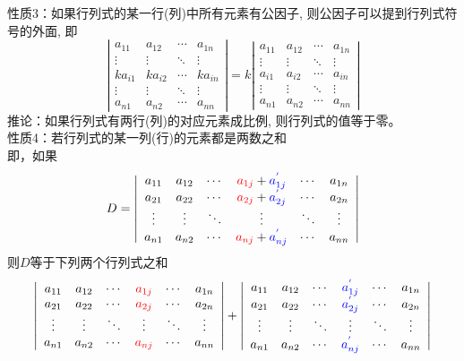 {\color{blue}性质3：}如果行列式的某一行(列)中所有元素有公因子, 则公因子可以提到行列式符号的外面, 即
$$
\left|
\begin{array}{cccc}
a_{11} & a_{12} & \cdots & a_{1n} \\
\vdots & \vdots & \ddots & \vdots \\
ka_{i1} & ka_{i2} & \cdots & ka_{in} \\
\vdots & \vdots & \ddots & \vdots \\
a_{n1} & a_{n2} & \cdots & a_{nn} 
\end{array}\right|=
k\left|
\begin{array}{cccc}
a_{11} & a_{12} & \cdots & a_{1n} \\
\vdots & \vdots & \ddots & \vdots \\
a_{i1} & a_{i2} & \cdots & a_{in} \\
\vdots & \vdots & \ddots & \vdots \\
a_{n1} & a_{n2} & \cdots & a_{nn} 
\end{array}\right|
$$
{\color{blue}推论：}如果行列式有两行(列)的对应元素成比例, 则行列式的值等于零。\\
{\color{blue}性质4：}若行列式的某一列(行)的元素都是两数之和\\
即，如果
$$
D=\left|
\begin{array}{cccccc}
a_{11} & a_{12} & \cdots & {\color{red} a_{1j}}+{\color{blue} a^{'}_{1j}} & \cdots & a_{1n}\\
a_{21} & a_{22} & \cdots & {\color{red} a_{2j}}+{\color{blue} a^{'}_{2j}} & \cdots & a_{2n}\\
\vdots & \vdots & \ddots & \vdots            & \ddots & \vdots \\
a_{n1} & a_{n2} & \cdots & {\color{red} a_{nj}}+{\color{blue} a^{'}_{nj}} & \cdots & a_{nn}\\
\end{array}\right|
$$
则$D$等于下列两个行列式之和
$$
\left|
\begin{array}{cccccc}
a_{11} & a_{12} & \cdots & {\color{red} a_{1j}} & \cdots & a_{1n}\\
a_{21} & a_{22} & \cdots & {\color{red} a_{2j}} & \cdots & a_{2n}\\
\vdots & \vdots & \ddots & \vdots            & \ddots & \vdots \\
a_{n1} & a_{n2} & \cdots & {\color{red} a_{nj}} & \cdots & a_{nn}\\
\end{array}\right|
+\left|
\begin{array}{cccccc}
a_{11} & a_{12} & \cdots & {\color{blue} a^{'}_{1j}} & \cdots & a_{1n}\\
a_{21} & a_{22} & \cdots & {\color{blue} a^{'}_{2j}} & \cdots & a_{2n}\\
\vdots & \vdots & \ddots & \vdots            & \ddots & \vdots \\
a_{n1} & a_{n2} & \cdots & {\color{blue} a^{'}_{nj}} & \cdots & a_{nn}\\
\end{array}\right|
$$
